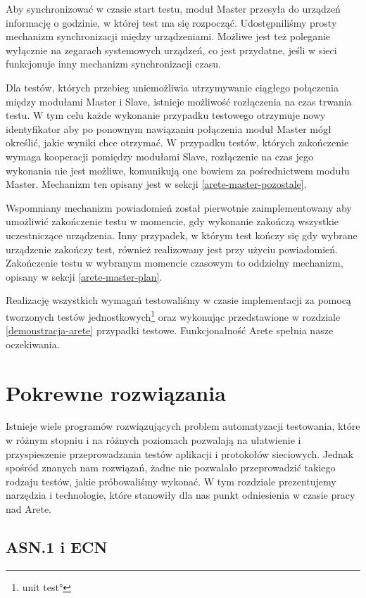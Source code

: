 \documentclass[00-praca-magisterska.tex]{subfiles}
\begin{document}
Aby synchronizować w czasie start testu, moduł Master przesyła do urządzeń
informację o godzinie, w której test ma się rozpocząć. Udostępniliśmy prosty
mechanizm synchronizacji między urządzeniami. Możliwe jest też poleganie
wyłącznie na zegarach systemowych urządzeń, co jest przydatne, jeśli w sieci
funkcjonuje inny mechanizm synchronizacji czasu.

Dla testów, których przebieg uniemożliwia utrzymywanie ciągłego połączenia
między modułami Master i Slave, istnieje możliwość rozłączenia na czas trwania
testu. W tym celu każde wykonanie przypadku testowego otrzymuje nowy
identyfikator aby po ponownym nawiązaniu połączenia moduł Master mógł określić,
jakie wyniki chce otrzymać. W przypadku testów, których zakończenie wymaga
kooperacji pomiędzy modułami Slave, rozłączenie na czas jego wykonania nie jest
możliwe, komunikują one bowiem za pośrednictwem modułu Master. Mechanizm ten
opisany jest w sekcji \ref{arete-master-pozostale}.

Wspomniany mechanizm powiadomień został pierwotnie zaimplementowany aby
umożliwić zakończenie testu w momencie, gdy wykonanie zakończą wszystkie
uczestniczące urządzenia. Inny przypadek, w którym test kończy się gdy wybrane
urządzenie zakończy test, również realizowany jest przy użyciu powiadomień.
Zakończenie testu w wybranym momencie czasowym to oddzielny mechanizm, opisany w
sekcji \ref{arete-master-plan}.

Realizację wszystkich wymagań testowaliśmy w czasie implementacji za pomocą
tworzonych testów jednostkowych\footnote{\ang{unit test}} oraz wykonując
przedstawione w rozdziale \ref{demonstracja-arete} przypadki testowe.
Funkcjonalność Arete spełnia nasze oczekiwania.

\section{Pokrewne rozwiązania}
\label{pokrewne-rozwiazania}

Istnieje wiele programów rozwiązujących problem automatyzacji testowania, które
w różnym stopniu i na różnych poziomach pozwalają na ułatwienie i przyspieszenie
przeprowadzania testów aplikacji i protokołów sieciowych. Jednak spośród znanych
nam rozwiązań, żadne nie pozwalało przeprowadzić takiego rodzaju testów, jakie
próbowaliśmy wykonać. W tym rozdziale prezentujemy narzędzia i technologie,
które stanowiły dla nas punkt odniesienia w czasie pracy nad Arete.

\subsection{ASN.1 i ECN}
\label{asn}
\end{document}
